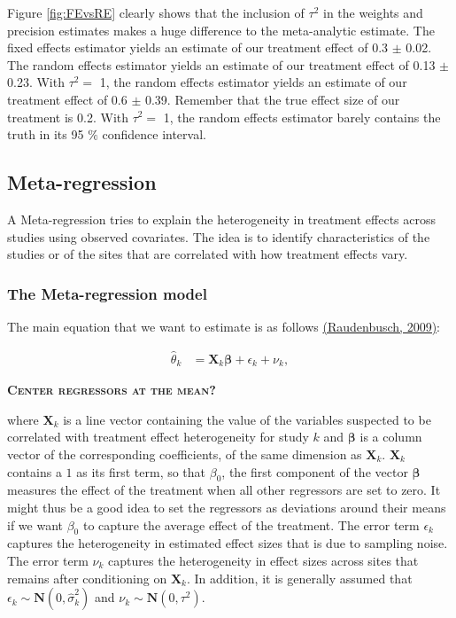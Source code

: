 \documentclass[]{book}
\theoremstyle{definition}
\theoremstyle{definition}
\theoremstyle{definition}
\theoremstyle{remark}
\begin{document}
Figure \ref{fig:FEvsRE} clearly shows that the inclusion of \(\tau^2\) in the weights and precision estimates makes a huge difference to the meta-analytic estimate.
The fixed effects estimator yields an estimate of our treatment effect of 0.3 \(\pm\) 0.02.
The random effects estimator yields an estimate of our treatment effect of 0.13 \(\pm\) 0.23.
With \(\tau^2=\) 1, the random effects estimator yields an estimate of our treatment effect of 0.6 \(\pm\) 0.39.
Remember that the true effect size of our treatment is 0.2.
With \(\tau^2=\) 1, the random effects estimator barely contains the truth in its 95 \(\%\) confidence interval.

\hypertarget{meta-regression}{%
\subsection{Meta-regression}\label{meta-regression}}

A Meta-regression tries to explain the heterogeneity in treatment effects across studies using observed covariates.
The idea is to identify characteristics of the studies or of the sites that are correlated with how treatment effects vary.

\hypertarget{the-meta-regression-model}{%
\subsubsection{The Meta-regression model}\label{the-meta-regression-model}}

The main equation that we want to estimate is as follows \href{https://www.jstor.org/stable/10.7758/9781610441384}{(Raudenbusch, 2009)}:

\begin{align}
  \hat{\theta}_k & = \mathbf{X}_k \mathbf{\beta}  + \epsilon_k + \nu_k,
\end{align}

\textbf{\textsc{Center regressors at the mean?}}

where \(\mathbf{X}_k\) is a line vector containing the value of the variables suspected to be correlated with treatment effect heterogeneity for study \(k\) and \(\mathbf{\beta}\) is a column vector of the corresponding coefficients, of the same dimension as \(\mathbf{X}_k\).
\(\mathbf{X}_k\) contains a \(1\) as its first term, so that \(\beta_0\), the first component of the vector \(\mathbf{\beta}\) measures the effect of the treatment when all other regressors are set to zero.
It might thus be a good idea to set the regressors as deviations around their means if we want \(\beta_0\) to capture the average effect of the treatment.
The error term \(\epsilon_k\) captures the heterogeneity in estimated effect sizes that is due to sampling noise.
The error term \(\nu_k\) captures the heterogeneity in effect sizes across sites that remains after conditioning on \(\mathbf{X}_k\).
In addition, it is generally assumed that \(\epsilon_k\sim\mathbf{N}(0,\hat{\sigma}^2_k)\) and \(\nu_k\sim\mathbf{N}(0,\tau^2)\).
\end{document}
